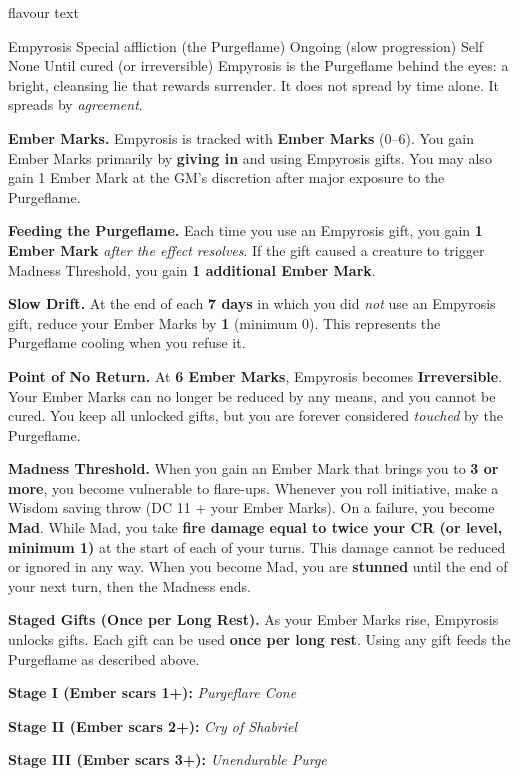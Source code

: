 \documentclass[letterpaper,twocolumn,openany,nodeprecatedcode,breakable,skins,xparse,most]{dndbook}
\begin{document}
flavour text

\DndSpellHeader%
  {Empyrosis}
  {Special affliction (the Purgeflame)}
  {Ongoing (slow progression)}
  {Self}
  {None}
  {Until cured (or irreversible)}
Empyrosis is the Purgeflame behind the eyes: a bright, cleansing lie that rewards surrender. It does not spread by time alone. It spreads by \emph{agreement}.

\textbf{Ember Marks.} Empyrosis is tracked with \textbf{Ember Marks} (0--6). You gain Ember Marks primarily by \textbf{giving in} and using Empyrosis gifts. You may also gain 1 Ember Mark at the GM's discretion after major exposure to the Purgeflame.

\textbf{Feeding the Purgeflame.} Each time you use an Empyrosis gift, you gain \textbf{1 Ember Mark} \emph{after the effect resolves}. If the gift caused a creature to trigger Madness Threshold, you gain \textbf{1 additional Ember Mark}.

\textbf{Slow Drift.} At the end of each \textbf{7 days} in which you did \emph{not} use an Empyrosis gift, reduce your Ember Marks by \textbf{1} (minimum 0). This represents the Purgeflame cooling when you refuse it.

\textbf{Point of No Return.} At \textbf{6 Ember Marks}, Empyrosis becomes \textbf{Irreversible}. Your Ember Marks can no longer be reduced by any means, and you cannot be cured. You keep all unlocked gifts, but you are forever considered \emph{touched} by the Purgeflame.

\textbf{Madness Threshold.} When you gain an Ember Mark that brings you to \textbf{3 or more}, you become vulnerable to flare-ups. Whenever you roll initiative, make a Wisdom saving throw (DC 11 + your Ember Marks). On a failure, you become \textbf{Mad}. While Mad, you take \textbf{fire damage equal to twice your CR (or level, minimum 1)} at the start of each of your turns. This damage cannot be reduced or ignored in any way. When you become Mad, you are \textbf{stunned} until the end of your next turn, then the Madness ends.

\textbf{Staged Gifts (Once per Long Rest).} As your Ember Marks rise, Empyrosis unlocks gifts. Each gift can be used \textbf{once per long rest}. Using any gift feeds the Purgeflame as described above.

\textbf{Stage I (Ember scars 1+):} \emph{Purgeflare Cone}

\textbf{Stage II (Ember scars 2+):} \emph{Cry of Shabriel}

\textbf{Stage III (Ember scars 3+):} \emph{Unendurable Purge}
\end{document}
